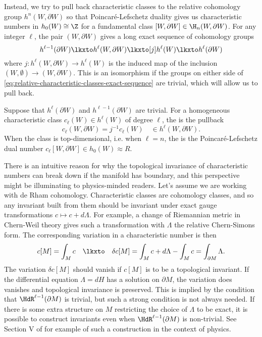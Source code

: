 Instead, we try to pull back characteristic classes to the relative cohomology group $h^n(W,\partial W)$ so that Poincar\'e-Lefschetz duality gives us characteristic numbers in $h_0(W)\cong \Z$ for a fundamental class $[W,\partial W]\in \H_n(W,\partial W)$.
For any integer $\ell$, the pair $(W, \partial W)$ gives a long exact sequence of cohomology groups
\begin{equation}\label{eq:relative-characteristic-classes-exact-sequence}
	h^{\ell-1}(\partial W) \lkxto h^{\ell}(W, \partial W) \lkxto[j] h^{\ell}(W) \lkxto h^{\ell}(\partial W)
\end{equation}
where $j : h^{\ell}(W, \partial W) \to h^{\ell}(W)$ is the induced map of the inclusion $(W,\emptyset) \to (W, \partial W)$. This is an isomorphism if the groups on either side of \cref{eq:relative-characteristic-classes-exact-sequence} are trivial, which will allow us to pull back.

\begin{definition}\label{defn:relative-characteristic_form}
	Suppose that $h^{\ell}(\partial W)$ and $h^{\ell-1}(\partial W)$ are trivial. For a homogeneous characteristic class $c_\ell(W) \in h^{\ell}(W)$ of degree $\ell$, the  is the pullback
	\[
		c_\ell(W, \partial W) = j^{-1} c_\ell(W) \quad\in h^{\ell}(W, \partial W).
	\]
	When the class is top-dimensional, i.e. when $\ell=n$, the  is the Poincar\'e-Lefschetz dual number $c_\ell[W,\partial W] \in h_0(W)\approx R$.
\end{definition}

\begin{remark}
	There is an intuitive reason for why the topological invariance of characteristic numbers can break down if the manifold has boundary, and this perspective might be illuminating to physics-minded readers. Let's assume we are working with de Rham cohomology. Characteristic classes are cohomology classes, and so any invariant built from them should be invariant under exact gauge transformations $c\mapsto c+d\Lambda$. For example, a change of Riemannian metric in Chern-Weil theory gives such a transformation with $\Lambda$ the relative Chern-Simons form. The corresponding variation in a characteristic number is then
	\[
		c[M] = \int_M c \quad\lkxto\quad \delta c[M] = \int_M c+d\Lambda-\int_M c = \int_{\partial M} \Lambda.
	\]
	The variation $\delta c[M]$ should vanish if $c[M]$ is to be a topological invariant. If the differential equation $\Lambda=dH$ has a solution on $\partial M$, the variation does vanishes and topological invariance is preserved. This is implied by the condition that $\HdR^{\ell-1}(\partial M)$ is trivial, but such a strong condition is not always needed. If there is some extra structure on $M$ restricting the choice of $\Lambda$ to be exact, it is possible to construct invariants even when $\HdR^{\ell-1}(\partial M)$ is non-trivial. See Section V of \cite{witten1985anomalies} for example of such a construction in the context of physics.
\end{remark}

